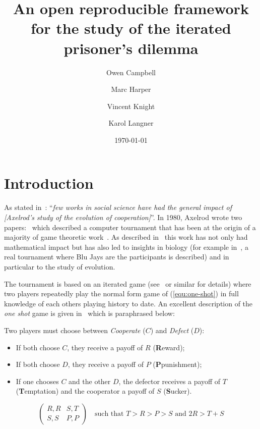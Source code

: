 \documentclass{article}
\title{An open reproducible framework for the study of the iterated prisoner's
dilemma}
\author{Owen Campbell\\
        \and
        Marc Harper\\
        \and
        Vincent Knight\\
        \and
        Karol Langner\\
}
\date{\today}
\begin{document}
\maketitle

\section{Introduction}\label{sec:introduction}

As stated in~\cite{Bendor2015}: ``\textit{few works in social science have had
the general impact of [Axelrod's study of the evolution of cooperation]}''.  In
1980, Axelrod wrote two papers:~\cite{Axelrod1980a,Axelrod1980b} which described
a computer tournament that has been at the origin of a majority of game
theoretic work~\cite{Banks1990, Bendor2015, Boyd1987, Chellapilla1999,
    DavidB1993, Doebeli2005, Ellison1994, Gotts2003, Isaac2008, Kraines1989,
    Lorberbaum1994, Milgrom1982, Molander1985, Murnighan2015, Press2012,
Stephens2002, Stewart2012}. As described in~\cite{Bendor2015} this work has not
only had mathematical impact but has also led to insights in biology (for
example in~\cite{Chellapilla1999}, a real tournament where Blu Jays are the
participants is described) and in particular to the study of evolution.

The tournament is based on an iterated game (see~\cite{Maschler2013} or similar
for details) where two players repeatedly play the normal form game of
(\ref{equ:one-shot}) in full knowledge of each others playing history to date.
An excellent description of the \textit{one shot} game is given
in~\cite{Gotts2003} which is paraphrased below:

Two players must choose between \textit{Cooperate} (\(C\)) and \textit{Defect}
(\(D\)):

\begin{itemize}
    \item If both choose \(C\), they receive a payoff of \(R\)
        (\textbf{R}eward);
    \item If both choose \(D\), they receive a payoff of \(P\)
        (\textbf{P}punishment);
    \item If one chooses \(C\) and the other \(D\), the defector receives a
        payoff of \(T\) (\textbf{T}emptation) and the cooperator a payoff of
        \(S\) (\textbf{S}ucker).
\end{itemize}

\begin{equation}
    \begin{pmatrix}
        R,R & S,T\\
        S,S & P,P
    \end{pmatrix}\quad\text{such that } T>R>P>S \text{ and } 2R > T + S
    \label{equ:one-shot}
\end{equation}
\end{document}
